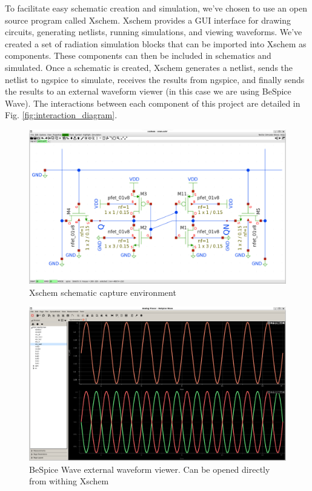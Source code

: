 \documentclass[conference]{IEEEtran}
\begin{document}
    To facilitate easy schematic creation and simulation, we've chosen to use an open source program called Xschem. Xschem provides a GUI interface for drawing circuits, generating netlists, running simulations, and viewing waveforms. We've created a set of radiation simulation blocks that can be imported into Xschem as components. These components can then be included in schematics and simulated. Once a schematic is created, Xschem generates a netlist, sends the netlist to ngspice to simulate, receives the results from ngspice, and finally sends the results to an external waveform viewer (in this case we are using BeSpice Wave). The interactions between each component of this project are detailed in Fig. \ref{fig:interaction_diagram}.
    
	\begin{figure}[htbp]
        \centering
        \includegraphics[width=0.95\linewidth]{xschem_env}
        \caption{Xschem schematic capture environment}
        \label{fig:xschem}
    \end{figure}
    
    \begin{figure}[htbp]
        \centering
        \includegraphics[width=0.95\linewidth]{bespicewave}
        \caption{BeSpice Wave external waveform viewer. Can be opened directly from withing Xschem}
        \label{fig:bespicewave}
    \end{figure}
\end{document}
